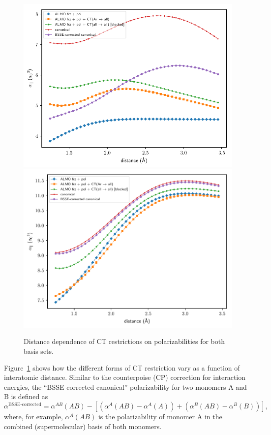 \documentclass[%
  class = book,%
  crop = false,%
  float = true,%
  multi = true,%
  preview = false,%
]{standalone}
\begin{document}
\begin{figure}
  \centering
  \includegraphics[scale=0.90]{almo_vs_bsse_canonical_onaxis_projected_short_def2-SVP.pdf}
  \includegraphics[scale=0.90]{almo_vs_bsse_canonical_onaxis_projected_short_def2-SVPD.pdf}
  \caption[Distance dependence of CT restrictions on polarizabilities]{Distance dependence of CT restrictions on polarizabilities for both basis sets.}
  \label{fig:distance-dependence-ct-levels}
\end{figure}

Figure~\ref{fig:distance-dependence-ct-levels} shows how the different forms of CT restriction vary as a function of interatomic distance. Similar to the counterpoise (CP) correction for interaction energies, the ``BSSE-corrected canonical'' polarizability for two monomers A and B is defined as
\begin{equation}
  \alpha^{\text{BSSE-corrected}} = \alpha^{AB}(AB) - \left[ \left( \alpha^{A}(AB) - \alpha^{A}(A) \right) + \left( \alpha^{B}(AB) - \alpha^{B}(B) \right) \right],
  \label{eq:bsse-corrected-polarizability}
\end{equation}
where, for example, \(\alpha^{A}(AB)\) is the polarizability of monomer A in the combined (supermolecular) basis of both monomers.
\end{document}
